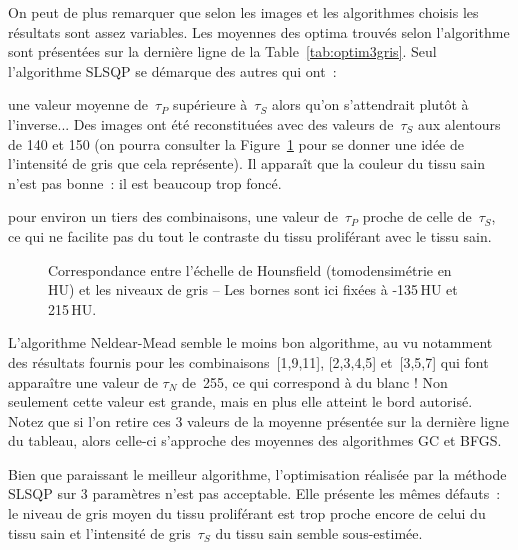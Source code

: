 \documentclass[main.tex]{subfiles}
\begin{document}
On peut de plus remarquer que selon les images et les algorithmes choisis les résultats sont assez variables. Les moyennes des optima trouvés selon l'algorithme sont présentées sur la dernière ligne de la Table~\ref{tab:optim3gris}. Seul l'algorithme SLSQP se démarque des autres qui ont~:
\begin{myitemize}
\item une valeur moyenne de~$\tau_P$ supérieure à~$\tau_S$ alors qu'on s'attendrait plutôt à l'inverse...  Des images ont été reconstituées avec des valeurs de~$\tau_S$ aux alentours de 140 et 150 (on pourra consulter la Figure~\ref{fig:schema_correspondance_gris} pour se donner une idée de l'intensité de gris que cela représente). Il apparaît que la couleur du tissu sain n'est pas bonne~: il est beaucoup trop foncé. 
\item pour environ un tiers des combinaisons, une valeur de~$\tau_P$ proche de celle de~$\tau_S$, ce qui ne facilite pas du tout le contraste du tissu proliférant avec le tissu sain.
\end{myitemize}

\begin{figure}[h]
\centering

\caption{\label{fig:schema_correspondance_gris} Correspondance entre l'échelle de Hounsfield (tomodensimétrie en HU) et les niveaux de gris -- Les bornes sont ici fixées à -135\,HU et 215\,HU.}
\end{figure}

L'algorithme Neldear-Mead semble le moins bon algorithme, au vu notamment des résultats fournis pour les combinaisons~[1,9,11], [2,3,4,5] et~[3,5,7] qui font apparaître une valeur de $\tau_N$ de~255, ce qui correspond à du blanc ! Non seulement cette valeur est grande, mais en plus elle atteint le bord autorisé. Notez que si l'on retire ces 3 valeurs de la moyenne présentée sur la dernière ligne du tableau, alors celle-ci s'approche des moyennes des algorithmes GC et BFGS. 

Bien que paraissant le meilleur algorithme, l'optimisation réalisée par la méthode SLSQP sur 3 paramètres n'est pas acceptable. Elle présente les mêmes défauts~: le niveau de gris moyen du tissu proliférant est trop proche encore de celui du tissu sain et l'intensité de gris~$\tau_S$  du tissu sain semble sous-estimée.
\end{document}
